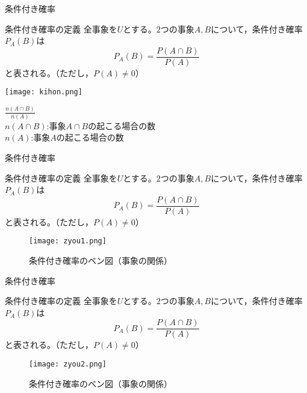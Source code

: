 \documentclass[aspectratio=169, dvipdfmx, 11pt]{beamer}
\begin{document}
\begin{frame}{条件付き確率}
    \begin{block}{条件付き確率の定義}
	全事象を$U$とする。$2$つの事象$A,B$について，条件付き確率$P_A(B)$は
	\begin{equation}
		P_A(B)=\frac{P(A\cap B)}{P(A)}
	\end{equation}
	と表される。（ただし，$P(A)\ne 0$）
    \end{block}

\begin{minipage}{.4\textwidth}
	\centering\texttt{[image: kihon.png]}
\end{minipage}
	\hfill
\begin{minipage}{.5\textwidth}
	\begin{tcolorbox}[colframe=blue,
    colback=blue!10!white,
    colbacktitle=blue!40!white,
    coltitle=black, fonttitle=\bfseries,
    title=memo]
$\frac{n(A\cap B)}{n(A)}$\\
$n(A\cap B)$:事象$A\cap B$の起こる場合の数\\
$n(A)$:事象$A$の起こる場合の数
	\end{tcolorbox}
\end{minipage}

\end{frame}


\begin{frame}{条件付き確率}
    \begin{block}{条件付き確率の定義}
	全事象を$U$とする。$2$つの事象$A,B$について，条件付き確率$P_A(B)$は
	\begin{equation}
		P_A(B)=\frac{P(A\cap B)}{P(A)}
	\end{equation}
	と表される。（ただし，$P(A)\ne 0$）
    \end{block}


\begin{figure}[H]
  \begin{center}
    \texttt{[image: zyou1.png]}
    \caption{条件付き確率のベン図（事象の関係）}
    \label{fig:graph5}
  \end{center}
\end{figure}

\end{frame}


\begin{frame}{条件付き確率}
    \begin{block}{条件付き確率の定義}
	全事象を$U$とする。$2$つの事象$A,B$について，条件付き確率$P_A(B)$は
	\begin{equation}
		P_A(B)=\frac{P(A\cap B)}{P(A)}
	\end{equation}
	と表される。（ただし，$P(A)\ne 0$）
    \end{block}

\begin{figure}[H]
  \begin{center}
    \texttt{[image: zyou2.png]}
    \caption{条件付き確率のベン図（事象の関係）}
    \label{fig:graph5}
  \end{center}
\end{figure}

\end{frame}
\end{document}

